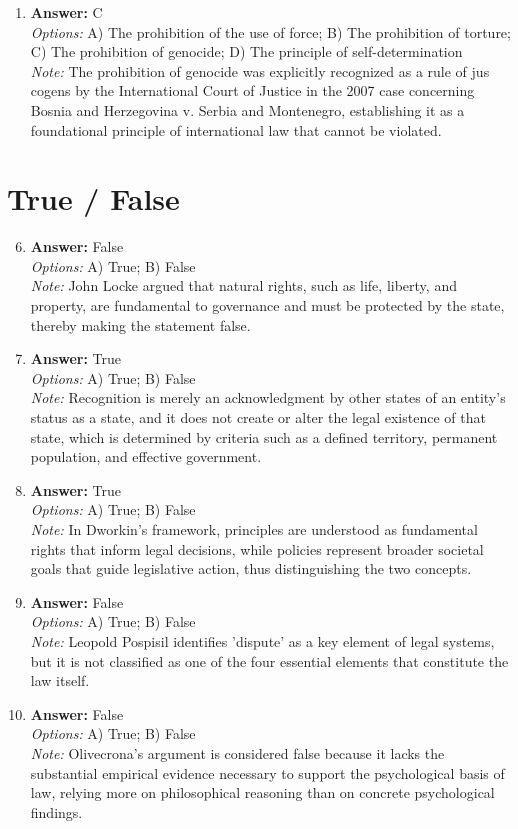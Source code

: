 \documentclass[12pt]{article}
\begin{document}
\begin{enumerate}[label=\arabic*.]
\item \textbf{Answer:} C
\\ \textit{Options:} A) The prohibition of the use of force; B) The prohibition of torture; C) The prohibition of genocide; D) The principle of self-determination
\\ \textit{Note:} The prohibition of genocide was explicitly recognized as a rule of jus cogens by the International Court of Justice in the 2007 case concerning Bosnia and Herzegovina v. Serbia and Montenegro, establishing it as a foundational principle of international law that cannot be violated.
\end{enumerate}

\section*{True / False}
\begin{enumerate}[label=\arabic*.]
\setcounter{enumi}{5}
\item \textbf{Answer:} False
\\ \textit{Options:} A) True; B) False
\\ \textit{Note:} John Locke argued that natural rights, such as life, liberty, and property, are fundamental to governance and must be protected by the state, thereby making the statement false.
\item \textbf{Answer:} True
\\ \textit{Options:} A) True; B) False
\\ \textit{Note:} Recognition is merely an acknowledgment by other states of an entity's status as a state, and it does not create or alter the legal existence of that state, which is determined by criteria such as a defined territory, permanent population, and effective government.
\item \textbf{Answer:} True
\\ \textit{Options:} A) True; B) False
\\ \textit{Note:} In Dworkin's framework, principles are understood as fundamental rights that inform legal decisions, while policies represent broader societal goals that guide legislative action, thus distinguishing the two concepts.
\item \textbf{Answer:} False
\\ \textit{Options:} A) True; B) False
\\ \textit{Note:} Leopold Pospisil identifies 'dispute' as a key element of legal systems, but it is not classified as one of the four essential elements that constitute the law itself.
\item \textbf{Answer:} False
\\ \textit{Options:} A) True; B) False
\\ \textit{Note:} Olivecrona's argument is considered false because it lacks the substantial empirical evidence necessary to support the psychological basis of law, relying more on philosophical reasoning than on concrete psychological findings.
\end{enumerate}
\end{document}
